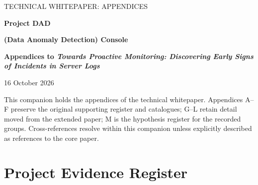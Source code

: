 \documentclass[11pt,a4paper]{article}
\begin{document}
\begin{titlepage}
\thispagestyle{empty}
{\small\sffamily\color{accent} TECHNICAL WHITEPAPER: APPENDICES\par}
\vspace{1.8cm}
{\Huge\bfseries\color{ink} Project DAD\par}
\vspace{0.3cm}
{\Large\bfseries\color{ink} (Data Anomaly Detection) Console\par}
\vspace{0.7cm}
{\LARGE\bfseries Appendices to \emph{Towards Proactive Monitoring: Discovering Early Signs of Incidents in Server Logs}\par}
\vspace{1.0cm}
{\large 16 October 2026\par}
\vfill
{\small This companion holds the appendices of the technical whitepaper. Appendices A--F preserve the original supporting register and catalogues; G--L retain detail moved from the extended paper; M is the hypothesis register for the recorded groups. Cross-references resolve within this companion unless explicitly described as references to the core paper.}
\end{titlepage}
\tableofcontents
\clearpage
{}
\appendix

\section{Project Evidence Register}
\label{app:evidence}
\end{document}
